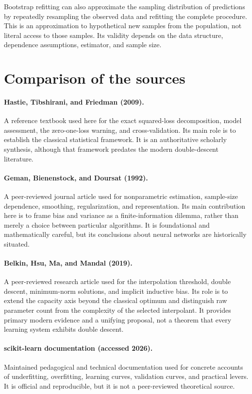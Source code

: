 \documentclass[11pt,a4paper]{article}
\begin{document}
Bootstrap refitting can also approximate the sampling distribution of predictions by repeatedly resampling the observed data and refitting the complete procedure. This is an approximation to hypothetical new samples from the population, not literal access to those samples. Its validity depends on the data structure, dependence assumptions, estimator, and sample size.

\section{Comparison of the sources}
\label{sec:sources}

\paragraph{Hastie, Tibshirani, and Friedman (2009).}
A reference textbook used here for the exact squared-loss decomposition, model assessment, the zero-one-loss warning, and cross-validation. Its main role is to establish the classical statistical framework. It is an authoritative scholarly synthesis, although that framework predates the modern double-descent literature.

\paragraph{Geman, Bienenstock, and Doursat (1992).}
A peer-reviewed journal article used for nonparametric estimation, sample-size dependence, smoothing, regularization, and representation. Its main contribution here is to frame bias and variance as a finite-information dilemma, rather than merely a choice between particular algorithms. It is foundational and mathematically careful, but its conclusions about neural networks are historically situated.

\paragraph{Belkin, Hsu, Ma, and Mandal (2019).}
A peer-reviewed research article used for the interpolation threshold, double descent, minimum-norm solutions, and implicit inductive bias. Its role is to extend the capacity axis beyond the classical optimum and distinguish raw parameter count from the complexity of the selected interpolant. It provides primary modern evidence and a unifying proposal, not a theorem that every learning system exhibits double descent.

\paragraph{scikit-learn documentation (accessed 2026).}
Maintained pedagogical and technical documentation used for concrete accounts of underfitting, overfitting, learning curves, validation curves, and practical levers. It is official and reproducible, but it is not a peer-reviewed theoretical source.
\end{document}
